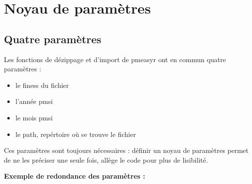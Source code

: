 \documentclass[]{book}
\providecommand{\tightlist}{%
  \setlength{\itemsep}{0pt}\setlength{\parskip}{0pt}}
\theoremstyle{definition}
\theoremstyle{definition}
\theoremstyle{definition}
\theoremstyle{remark}
\begin{document}
\chapter{Noyau de paramètres}\label{noyau-de-parametres}

\section{Quatre paramètres}\label{quatre-parametres}

Les fonctions de dézippage et d'import de pmeasyr ont en commun quatre
paramètres :

\begin{itemize}
\tightlist
\item
  le finess du fichier
\item
  l'année pmsi
\item
  le mois pmsi
\item
  le path, repértoire où se trouve le fichier
\end{itemize}

Ces paramètres sont toujours nécessaires : définir un noyau de
paramètres permet de ne les préciser une seule fois, allège le code pour
plus de lisibilité.

\textbf{Exemple de redondance des paramètres :}
\end{document}
